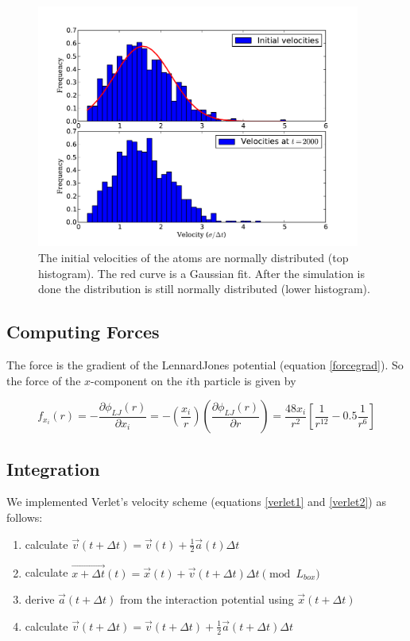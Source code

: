 \documentclass{article}
\begin{document}
\begin{figure}[!htb]
  \centering
    \includegraphics[height=80mm]{velocity_ic.pdf}
  \caption[]{The initial velocities of the atoms are normally distributed (top histogram). The red curve is a Gaussian fit. After the simulation is done the distribution is still normally distributed (lower histogram).}
  \label{fig:velocity_ic}
\end{figure}

\subsection{Computing Forces}
The force is the gradient of the Lennard\text{-}Jones potential (equation \ref{forcegrad}). So the force of the $x$-component on the $i$th particle is given by

\begin{equation}
 f_{x_i}(r) = - \frac{\partial \phi_{LJ}(r)}{\partial x_i}
 = - \left( \frac{x_i}{r} \right) \left( \frac{\partial \phi_{LJ}(r)}{\partial r} \right)
 =\frac{48x_i}{r^2} \left[ \frac{1}{r^{12}} - 0.5\frac{1}{r^6} \right]
\end{equation}

\subsection{Integration}
We implemented Verlet's velocity scheme (equations \ref{verlet1} and \ref{verlet2}) as follows:

\begin{enumerate}
 \item calculate $\vec{v}\left(t + \Delta t \right) = \vec{v}(t) + \frac{1}{2} \vec{a}(t)\Delta t$
 \item calculate $\vec{x+\Delta t}(t) = \vec{x}(t)+\vec{v}(t+ \Delta t)\Delta t \pmod{L_{box}}$
 \item derive $\vec{a}(t + \Delta t)$ from the interaction potential using $\vec{x}(t+\Delta t)$
 \item calculate $\vec{v}\left(t + \Delta t \right) = \vec{v}(t+\Delta t) + \frac{1}{2} \vec{a}(t+\Delta t)\Delta t$
\end{enumerate}
\end{document}
